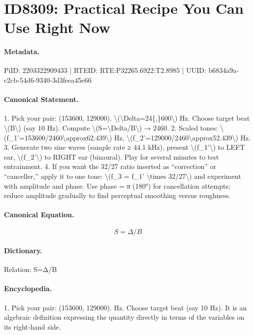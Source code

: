 \section*{ID8309: Practical Recipe You Can Use Right Now}
\paragraph{Metadata.}
PiID: 2203322909433 | RTEID: RTE:P32265.6922:T2.8985 | UUID: b6834a9a-c2cb-54d6-9340-3d3feea45e66

\paragraph{Canonical Statement.}
1. Pick your pair: (153600, 129000). \textbackslash{}(\textbackslash{}Delta=24\{,\}600\textbackslash{}) Hz. Choose target beat \textbackslash{}(B\textbackslash{}) (say 10 Hz). Compute \textbackslash{}(S=\textbackslash{}Delta/B\textbackslash{}) → 2460. 2. Scaled tones: \textbackslash{}(f\_1'=153600/2460\textbackslash{}approx62.439\textbackslash{}) Hz, \textbackslash{}(f\_2'=129000/2460\textbackslash{}approx52.439\textbackslash{}) Hz. 3. Generate two sine waves (sample rate ≥ 44.1 kHz), present \textbackslash{}(f\_1'\textbackslash{}) to LEFT ear, \textbackslash{}(f\_2'\textbackslash{}) to RIGHT ear (binaural). Play for several minutes to test entrainment. 4. If you want the 32/27 ratio inserted as “correction” or “canceller,” apply it to one tone: \textbackslash{}(f\_3 = f\_1' \textbackslash{}times 32/27\textbackslash{}) and experiment with amplitude and phase. Use phase = π (180°) for cancellation attempts; reduce amplitude gradually to find perceptual smoothing versus roughness.

\paragraph{Canonical Equation.}
\[
S=\Delta/B
\]

\paragraph{Dictionary.}
Relation: S=Δ/B

\paragraph{Encyclopedia.}
1. Pick your pair: (153600, 129000). Hz. Choose target beat (say 10 Hz). It is an algebraic definition expressing the quantity directly in terms of the variables on its right-hand side.
